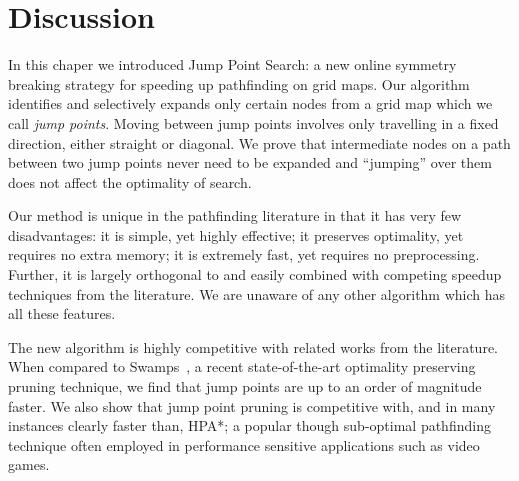 \section{Discussion}
\label{cha::jps::discussion}
In this chaper we introduced Jump Point Search: a new online symmetry breaking
strategy for speeding up pathfinding on grid maps.  Our algorithm identifies
and selectively expands only certain nodes from a grid map which we call
\emph{jump points}.  Moving between jump points involves only travelling in a
fixed direction, either straight or diagonal.  We prove that intermediate nodes
on a path between two jump points never need to be expanded and ``jumping'' over
them does not affect the optimality of search. 
\par
Our method is unique in the pathfinding literature in that it has very few
disadvantages: it is simple, yet highly effective; it preserves optimality, yet
requires no extra memory;  it is extremely fast, yet requires no preprocessing.
Further, it is largely orthogonal to and easily combined with 
competing speedup techniques from the literature.
We are unaware of any other algorithm which has all these features.
\par
The new algorithm is highly competitive with related works from the literature.
When compared to Swamps~\citep{pochter10}, 
a recent state-of-the-art optimality preserving pruning
technique, we find that jump points are up to an order of magnitude faster.
We also show that jump point pruning is competitive with, and in
many instances clearly faster than, HPA*; a popular though sub-optimal pathfinding
technique often employed in performance sensitive applications such as
video games.
